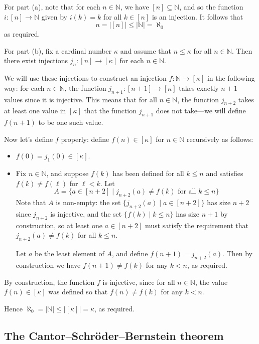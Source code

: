 \begin{cproof}
For part (a), note that for each $n \in \mathbb{N}$, we have $[n] \subseteq \mathbb{N}$, and so the function $i : [n] \to \mathbb{N}$ given by $i(k) = k$ for all $k \in [n]$ is an injection. It follows that
\[ n = |[n]| \le |\mathbb{N}| = \aleph_0 \]
as required.

For part (b), fix a cardinal number $\kappa$ and assume that $n \le \kappa$ for all $n \in \mathbb{N}$. Then there exist injections $j_n : [n] \to [\kappa]$ for each $n \in \mathbb{N}$.

We will use these injections to construct an injection $f : \mathbb{N} \to [\kappa]$ in the following way: for each $n \in \mathbb{N}$, the function $j_{n+1} : [n+1] \to [\kappa]$ takes exactly $n+1$ values since it is injective. This means that for all $n \in \mathbb{N}$, the function $j_{n+2}$ takes at least one value in $[\kappa]$ that the function $j_{n+1}$ does not take---we will define $f(n+1)$ to be one such value.

Now let's define $f$ properly: define $f(n) \in [\kappa]$ for $n \in \mathbb{N}$ recursively as follows:
\begin{itemize}
\item $f(0) = j_1(0) \in [\kappa]$.
\item Fix $n \in \mathbb{N}$, and suppose $f(k)$ has been defined for all $k \le n$ and satisfies $f(k) \ne f(\ell)$ for $\ell < k$. Let
\[ A = \{ a \in [n+2] \mid j_{n+2}(a) \ne f(k) \text{ for all } k \le n \} \]
Note that $A$ is non-empty: the set $\{ j_{n+2}(a) \mid a \in [n+2] \}$ has size $n+2$ since $j_{n+2}$ is injective, and the set $\{ f(k) \mid k \le n \}$ has size $n+1$ by construction, so at least one $a \in [n+2]$ must satisfy the requirement that $j_{n+2}(a) \ne f(k)$ for all $k \le n$.

Let $a$ be the least element of $A$, and define $f(n+1) = j_{n+2}(a)$. Then by construction we have $f(n+1) \ne f(k)$ for any $k < n$, as required.
\end{itemize}

By construction, the function $f$ is injective, since for all $n \in \mathbb{N}$, the value $f(n) \in [\kappa]$ was defined so that $f(n) \ne f(k)$ for any $k < n$.

Hence $\aleph_0 = |\mathbb{N}| \le |[\kappa]| = \kappa$, as required.
\end{cproof}

\subsection*{The Cantor--Schr\"{o}der--Bernstein theorem}

